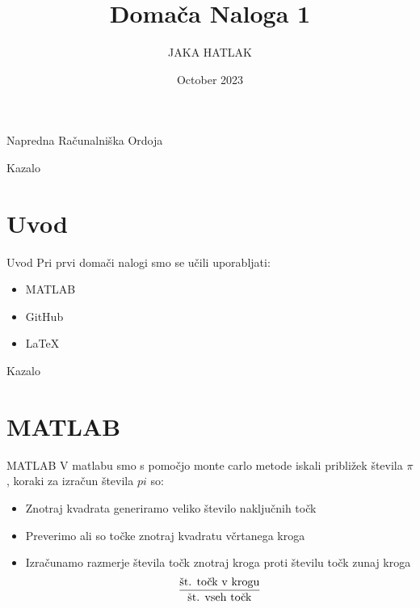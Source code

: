 \documentclass{beamer}
\title{Domača Naloga 1}
\author{JAKA HATLAK}
\date{October 2023}
\begin{document}
\begin{frame}{\small Napredna Računalniška Ordoja}
    \titlepage
\end{frame}

\begin{frame}{\small Kazalo}
    \tableofcontents
\end{frame}

\section{Uvod}
\begin{frame}{\small Uvod}
    Pri prvi domači nalogi smo se učili uporabljati:
    \begin{itemize}
        \item{MATLAB}
        \pause
        \item{GitHub}
        \pause
        \item{LaTeX}
    \end{itemize}
    
\end{frame}

\begin{frame}{\small Kazalo}
    \tableofcontents
\end{frame}

\section{MATLAB}
\begin{frame}{\small MATLAB}
    V matlabu smo s pomočjo monte carlo metode iskali približek števila $\pi$, koraki za izračun števila $pi$ so:
        \begin{itemize}
        \item{Znotraj kvadrata generiramo veliko število naključnih točk}
        \pause
        \item{Preverimo ali so točke znotraj kvadratu včrtanega kroga}
        \pause
        \item{Izračunamo razmerje  števila točk znotraj kroga proti številu točk zunaj kroga $$\frac{\textnormal{št. točk v krogu}}{\textnormal{št. vseh točk}}$$}
    \end{itemize}
    
\end{frame}
\end{document}
